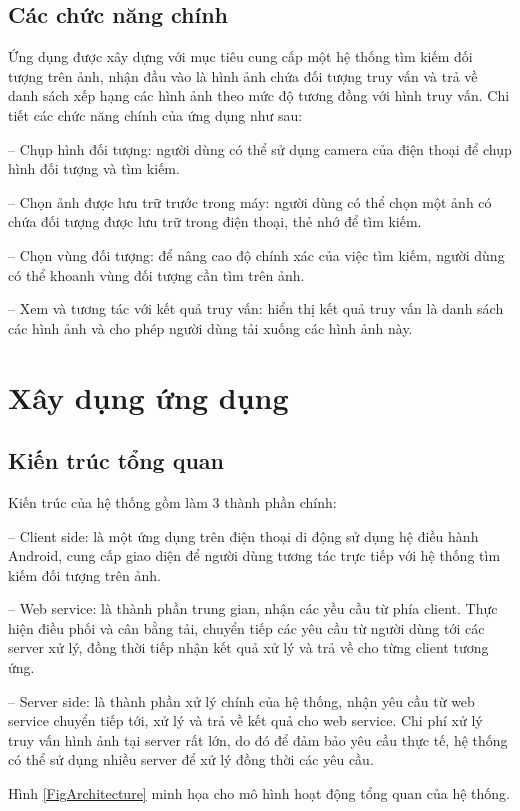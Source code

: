 	\subsection{Các chức năng chính}
Ứng dụng được xây dựng với mục tiêu cung cấp một hệ thống tìm kiếm đối tượng trên ảnh, nhận đầu vào là hình ảnh chứa đối tượng truy vấn và trả về danh sách xếp hạng các hình ảnh theo mức độ tương đồng với hình truy vấn. Chi tiết các chức năng chính của ứng dụng như sau:

-- Chụp hình đối tượng: người dùng có thể sử dụng camera của điện thoại để chụp hình đối tượng và tìm kiếm.

-- Chọn ảnh được lưu trữ trước trong máy: người dùng có thể chọn một ảnh có chứa đối tượng được lưu trữ trong điện thoại, thẻ nhớ để tìm kiếm.

-- Chọn vùng đối tượng: để nâng cao độ chính xác của việc tìm kiếm, người dùng có thể khoanh vùng đối tượng cần tìm trên ảnh.

-- Xem và tương tác với kết quả truy vấn: hiển thị kết quả truy vấn là danh sách các hình ảnh và cho phép người dùng tải xuống các hình ảnh này.

\section{Xây dụng ứng dụng}
\label{c5-thietke}

	\subsection{Kiến trúc tổng quan}
Kiến trúc của hệ thống gồm làm 3 thành phần chính:

-- Client side: là một ứng dụng trên điện thoại di động sử dụng hệ điều hành Android, cung cấp giao diện để người dùng tương tác trực tiếp với hệ thống tìm kiếm đối tượng trên ảnh.

-- Web service: là thành phần trung gian, nhận các yều cầu từ phía client. Thực hiện điều phối và cân bằng tải, chuyển tiếp các yêu cầu từ người dùng tới các server xử lý, đồng thời tiếp nhận kết quả xử lý và trả về cho từng client tương ứng.

-- Server side: là thành phần xử lý chính của hệ thống, nhận yêu cầu từ web service chuyển tiếp tới, xử lý và trả về kết quả cho web service. Chi phí xử lý truy vấn hình ảnh tại server rất lớn, do đó để đảm bảo yêu cầu thực tế, hệ thống có thể sử dụng nhiều server để xử lý đồng thời các yêu cầu.

Hình \ref{FigArchitecture} minh họa cho mô hình hoạt động tổng quan của hệ thống.

